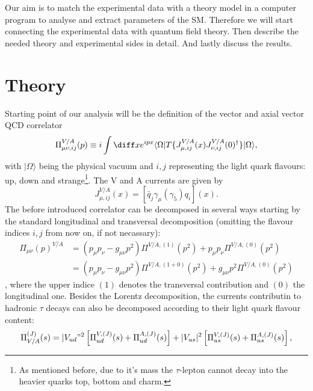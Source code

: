 Our aim is to match the experimental data with a theory model in a computer program to analyse and extract parameters of the SM. Therefore we will start connecting the experimental data with quantum field theory. Then describe the needed theory and experimental sides in detail. And lastly discuss the results.

\newpage

\section{Theory}
Starting point of our analysis will be the definition of the vector and axial vector QCD correlator
\begin{equation}
	\Pi_{\mu\nu, ij}^{V/A} (p) \equiv i \int \diff x e^{ipx} \langle \Omega | T \{ J_{\mu, ij}^{V/A} (x) J_{\nu, ij}^{V/A}(0)^\dagger\} | \Omega \rangle,
\end{equation}
with $| \Omega \rangle$ being the physical vacuum and $i,j$ representing the light quark flavours: up, down and strange\footnote{As mentioned before, due to it's mass the $\tau$-lepton cannot decay into the heavier quarks top, bottom and charm.}. The V and A currents are given by
\begin{equation}
	J_{\mu,ij}^{V/A}(x) = [ \bar q_j \gamma_\mu (\gamma_5) q_i](x). 
\end{equation}
The before introduced correlator can be decomposed in several ways starting by the standard longitudinal and transversal decomposition (omitting the flavour indices $i,j$ from now on, if not necassary):
\begin{equation} \label{eq:CorrelatorSpinDecomposition}
	\begin{split}
		\Pi_{\mu\nu}(p)^{V/A} &= (p_\mu p_\nu - g_{\mu\nu} p^2) \Pi^{V/A,(1)}(p^2) + p_\mu p_\nu \Pi^{V/A,(0)}(p^2) \\
		&= (p_\mu p_\nu - g_{\mu\nu}p^2) \Pi^{V/A, (1+0)}(p^2) + g_{\mu\nu} p^2 \Pi^{V/A, (0)}(p^2)
	\end{split}
\end{equation},
where the upper indice $(1)$ denotes the transversal contribution and $(0)$ the longitudinal one. Besides the Lorentz decomposition, the currents contributin to hadronic $\tau$ decays can also be decomposed according to their light quark flavour content:
\begin{equation}
	\Pi_{V/A}^{(J)}(s) = |V_{ud}"^2 \left[ \Pi_{ud}^{V,(J)}(s) + \Pi_{ud}^{A,(J)}(s) \right] + |V_{us}|^2 \left[\Pi_{us}^{V,(J)}(s) + \Pi_{us}^{A,(J)}(s) \right], 
\end{equation}
